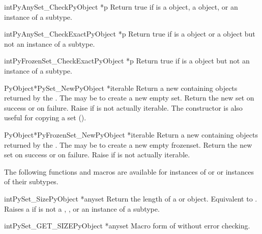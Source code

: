 \begin{cfuncdesc}{int}{PyAnySet_Check}{PyObject *p}
  Return true if  is a  object, a 
  object, or an instance of a subtype.
\end{cfuncdesc}

\begin{cfuncdesc}{int}{PyAnySet_CheckExact}{PyObject *p}
  Return true if  is a  object or a 
  object but not an instance of a subtype.
\end{cfuncdesc}

\begin{cfuncdesc}{int}{PyFrozenSet_CheckExact}{PyObject *p}
  Return true if  is a  object
  but not an instance of a subtype.
\end{cfuncdesc}

\begin{cfuncdesc}{PyObject*}{PySet_New}{PyObject *iterable}
  Return a new  containing objects returned by the
  .  The  may be \NULL{} to create a
  new empty set.  Return the new set on success or \NULL{} on
  failure.  Raise  if  is
  not actually iterable.  The constructor is also useful for
  copying a set ().
\end{cfuncdesc}

\begin{cfuncdesc}{PyObject*}{PyFrozenSet_New}{PyObject *iterable}
  Return a new  containing objects returned by the
  .  The  may be \NULL{} to create a
  new empty frozenset.  Return the new set on success or \NULL{} on
  failure.  Raise  if  is
  not actually iterable.
\end{cfuncdesc}


The following functions and macros are available for instances of
 or  or instances of their subtypes.

\begin{cfuncdesc}{int}{PySet_Size}{PyObject *anyset}
  Return the length of a  or  object.
  Equivalent to .  Raises a
   if  is not a ,
  , or an instance of a subtype.
\end{cfuncdesc}

\begin{cfuncdesc}{int}{PySet_GET_SIZE}{PyObject *anyset}
  Macro form of  without error checking.
\end{cfuncdesc}

